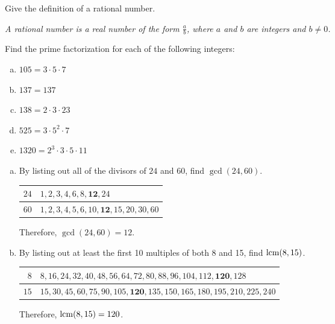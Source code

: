 \documentclass[11pt,letterpaper]{article}
\begin{document}

 Give the definition of a rational number. \pvspace{0.8cm}

{\itshape A rational number is a real number of the form $\frac{a}{b}$, where $a$ and $b$ are integers and $b \neq 0$.} \pvspace{1.3cm}





 Find the prime factorization for each of the following integers: 
\begin{enumerate}[(a)]
\item $105= 3 \cdot 5 \cdot 7$ \vfill
\item $137= 137$ \vfill
\item $138= 2 \cdot 3 \cdot 23$ \vfill
\item $525= 3 \cdot 5^2 \cdot 7$ \vfill
\item $1320= 2^3 \cdot 3 \cdot 5 \cdot 11$ \vfill
\end{enumerate}





\newpage





\begin{enumerate}[(a)]
\item By listing out all of the divisors of $24$ and $60$, find $\gcd(24, 60)$. \pvspace{1cm}

{\itshape
	\begin{table}[!ht]
	\centering
	\begin{tabular}{r||l}
	$24$ & $1, 2, 3, 4, 6, 8, \mathbf{12}, 24$ \\ \hline
	$60$ & $1, 2, 3, 4, 5, 6, 10, \mathbf{12}, 15, 20, 30, 60$
	\end{tabular}
	\end{table} \par
Therefore, $\gcd(24,60)= 12$.} \pvspace{1.7cm}

\item By listing out at least the first 10 multiples of both 8 and 15, find $\operatorname{lcm}(8, 15)$. \pvspace{1cm}
{\itshape
	\begin{table}[!ht]
	\centering
	\begin{tabular}{r||l}
	$8$ & $8, 16, 24, 32, 40, 48, 56, 64, 72, 80, 88, 96, 104, 112, \mathbf{120}, 128$ \\ \hline
	$15$ & $15, 30, 45, 60, 75, 90, 105, \mathbf{120}, 135, 150, 165, 180, 195, 210, 225, 240$
	\end{tabular}
	\end{table} \par
Therefore, $\operatorname{lcm}(8,15)= 120$.} \pvspace{1.7cm}
\end{enumerate}
\end{document}
